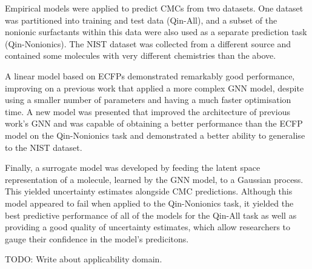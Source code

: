 Empirical models were applied to predict CMCs from two datasets. One dataset was
partitioned into training and test data (Qin-All), and a subset of the nonionic
surfactants within this data were also used as a separate prediction task
(Qin-Nonionics). The NIST dataset was collected from a different source and
contained some molecules with very different chemistries than the above.

A linear model based on ECFPs demonstrated remarkably good performance,
improving on a previous work \cite{qinPredictingCriticalMicelle2021} that
applied a more complex GNN model, despite using a smaller number of parameters
and having a much faster optimisation time. A new model was presented that
improved the architecture of previous work's GNN and was capable of obtaining a
better performance than the ECFP model on the Qin-Nonionics task and
demonstrated a better ability to generalise to the NIST dataset.

Finally, a surrogate model was developed by feeding the latent space
representation of a molecule, learned by the GNN model, to a Gaussian process.
This yielded uncertainty estimates alongside CMC predictions. Although this
model appeared to fail when applied to the Qin-Nonionics task, it yielded the
best predictive performance of all of the models for the Qin-All task as well as
providing a good quality of uncertainty estimates, which allow researchers to
gauge their confidence in the model's predicitons.

TODO: Write about applicability domain.